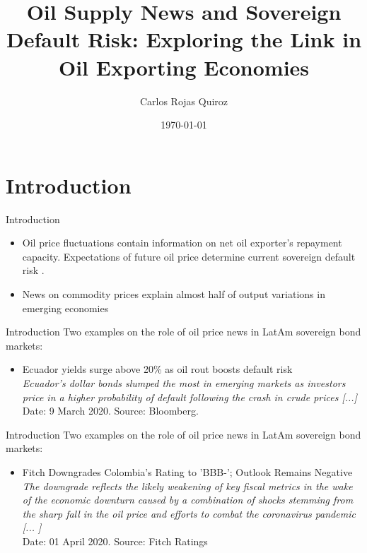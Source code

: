 \documentclass[compress,11pt,aspectratio=43]{beamer}
\title{{\Large{{Oil Supply News and Sovereign Default Risk:
Exploring the Link in Oil Exporting Economies}}}}
\author{\normalsize{Carlos Rojas Quiroz}}
\institute{\normalsize{European University Institute}}
\date{\normalsize{\today}}
\begin{document}
\begin{frame}[plain]
    \titlepage 
\end{frame}
\section{Introduction}
\begin{frame}[label=Intro]{Introduction}
    \begin{itemize}
        \item Oil price fluctuations contain information on net oil exporter's repayment capacity. Expectations of future oil price determine current sovereign default risk \citep{fernandez2018sharing}.
        \item News on commodity prices explain almost half of output variations in emerging economies \citep{benzeev2017emerging}
    \end{itemize}
\end{frame}
\begin{frame}[label=Intro3]{Introduction}
Two examples on the role of oil price news in LatAm sovereign bond markets:
    \vspace{0.25cm}
    \begin{itemize}        
        \item[] \textcolor{myblue}{{\large Ecuador yields surge above 20\% as oil rout boosts default risk}} \\
            \textit{Ecuador’s dollar bonds slumped the most in emerging markets as investors price in a higher probability of default following the crash in crude prices [...] } \\
            \vspace{0.25cm}
            Date: 9 March 2020. Source: Bloomberg.
    \end{itemize}   
\end{frame}
\begin{frame}[label=IntroApp1]{Introduction}
Two examples on the role of oil price news in LatAm sovereign bond markets:
	\vspace{0.25cm}
	\begin{itemize}
		\item[] \textcolor{myblue}{\large Fitch Downgrades Colombia's Rating to 'BBB-'; Outlook Remains Negative} \\
		\textit{The downgrade reflects the likely weakening of key fiscal metrics in the wake of the economic downturn caused by a combination of shocks stemming from the sharp fall in the oil price and efforts to combat the coronavirus pandemic [... ] } \\
		\vspace{0.25cm}
		Date: 01 April 2020. Source: Fitch Ratings
	\end{itemize}		
\end{frame}
\end{document}
